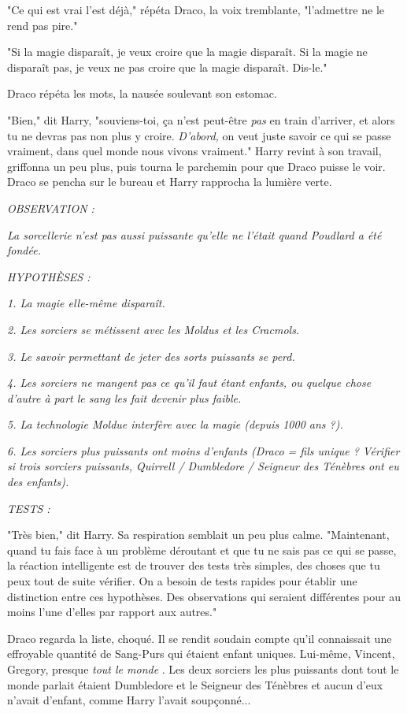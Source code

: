 "Ce qui est vrai l'est déjà," répéta Draco, la voix tremblante, "l'admettre ne le rend pas pire."

"Si la magie disparaît, je veux croire que la magie disparaît. Si la magie ne disparaît pas, je veux ne pas croire que la magie disparaît. Dis-le."

Draco répéta les mots, la nausée soulevant son estomac.

"Bien," dit Harry, "souviens-toi, ça n'est peut-être \emph{pas}  en train d'arriver, et alors tu ne devras pas non plus y croire. \emph{D'abord, } on veut juste savoir ce qui se passe vraiment, dans quel monde nous vivons vraiment." Harry revint à son travail, griffonna un peu plus, puis tourna le parchemin pour que Draco puisse le voir. Draco se pencha sur le bureau et Harry rapprocha la lumière verte.

\emph{\MakeUppercase{Observation :}} 

\emph{La sorcellerie n'est pas aussi puissante qu'elle ne l'était quand Poudlard a été fondée.} 

\emph{\MakeUppercase{Hypothèses :}} 

\emph{1. La magie elle-même disparaît.} 

\emph{2. Les sorciers se métissent avec les Moldus et les Cracmols.} 

\emph{3. Le savoir permettant de jeter des sorts puissants se perd.} 

\emph{4. Les sorciers ne mangent pas ce qu'il faut étant enfants, ou quelque chose d'autre à part le sang les fait devenir plus faible.} 

\emph{5. La technologie Moldue interfère avec la magie (depuis 1000 ans ?).} 

\emph{6. Les sorciers plus puissants ont moins d'enfants (Draco = fils unique ? Vérifier si trois sorciers puissants, Quirrell / Dumbledore / Seigneur des Ténèbres ont eu des enfants).} 

\emph{\MakeUppercase{Tests :}} 

"Très bien," dit Harry. Sa respiration semblait un peu plus calme. "Maintenant, quand tu fais face à un problème déroutant et que tu ne sais pas ce qui se passe, la réaction intelligente est de trouver des tests très simples, des choses que tu peux tout de suite vérifier. On a besoin de tests rapides pour établir une distinction entre ces hypothèses. Des observations qui seraient différentes pour au moins l'une d'elles par rapport aux autres."

Draco regarda la liste, choqué. Il se rendit soudain compte qu'il connaissait une effroyable quantité de Sang-Purs qui étaient enfant uniques. Lui-même, Vincent, Gregory, presque \emph{tout le monde} . Les deux sorciers les plus puissants dont tout le monde parlait étaient Dumbledore et le Seigneur des Ténèbres et aucun d'eux n'avait d'enfant, comme Harry l'avait soupçonné...

